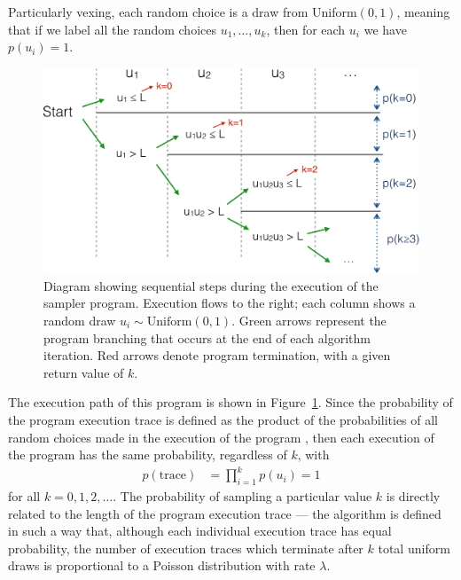 \documentclass[11pt,reqno]{amsart}
\newcommand{\+}[1]{\ensuremath{{\mathbf{#1}}}}
\begin{document}
Particularly vexing, each random choice is a draw from Uniform$(0, 1)$, meaning that if we label all the random choices $u_1, \dots, u_k$, then for each $u_i$ we have $p(u_i) = 1$.

\begin{figure}[tb]
\centering
\includegraphics[width=\textwidth]{execution-diagram-crop}
\caption{Diagram showing sequential steps during the execution of the sampler program.
Execution flows to the right; each column shows a random draw $u_i \sim \mathrm{Uniform}(0, 1)$.
Green arrows represent the program branching that occurs at the end of each algorithm iteration.
Red arrows denote program termination, with a given return value of $k$.}
\label{fig:exec}
\end{figure}

The execution path of this program is shown in Figure~\ref{fig:exec}.
Since the probability of the program execution trace is defined as the product of the probabilities of all random choices made in the execution of the program \cite{Wood-AISTATS-2014,Paige-ICML-2014},
then each execution of the program has the same probability, regardless of $k$, with
\begin{align}
p(\mathrm{trace}) &= \prod_{i=1}^k p(u_i) = 1
\end{align}
for all $k = 0, 1, 2, \dots$.
The probability of sampling a particular value $k$ is directly related to the length of the program execution trace ---
the algorithm is defined in such a way that, although each individual execution trace has equal probability, the number of execution traces which terminate after $k$ total uniform draws is proportional to a Poisson distribution with rate $\lambda$.
\end{document}
